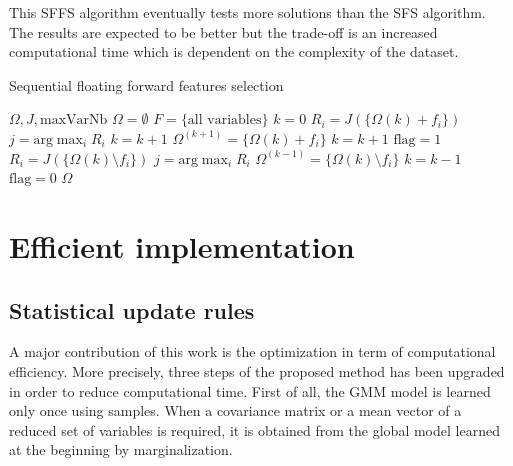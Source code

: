 \documentclass[journal,peerreview,onecolumn]{IEEEtran}
\begin{document}
            This SFFS algorithm eventually tests more solutions than the SFS algorithm. The results are expected to be better but the trade-off is an increased computational time which is dependent on the complexity of the dataset.

            \begin{algorithm}
            \caption{Sequential floating forward features selection\label{alg:sffs}}
            {\footnotesize
            \begin{algorithmic}[1]
            \REQUIRE $\Omega,J,\text{maxVarNb}$
            \STATE $\Omega=\emptyset$
            \STATE $F=\text{\{all variables\}}$
            \STATE $k=0$
            \STATE $R_i = J(\{\Omega{(k)} + f_i\})$
            \ENDFOR
            \STATE $j=\text{arg} \max_{i} R_i$
            \STATE $k=k+1$
            \ELSE
            \STATE $\Omega^{(k+1)} = \{\Omega{(k)} + f_i\}$
            \STATE $k=k+1$
            \STATE $\text{flag}=1$
            \STATE $R_i = J(\{\Omega{(k)}\setminus f_i\})$
            \ENDFOR
            \STATE $j=\text{arg} \max_{i} R_i$
            \STATE $\Omega^{(k-1)} = \{\Omega{(k)} \setminus f_i\}$
            \STATE $k=k-1$
            \ELSE
            \STATE $\text{flag}=0$
            \ENDIF
            \ENDWHILE
            \ENDIF
            \ENDWHILE
            \RETURN $\Omega$
            \end{algorithmic}
            }
            \end{algorithm}


\section{Efficient implementation}
\label{sec:implementation}

    \subsection{Statistical update rules}
    A major contribution of this work is the optimization in term of computational efficiency. More precisely, three steps of the proposed method has been upgraded in order to reduce computational time. First of all, the GMM model is learned only once using samples. When a covariance matrix or a mean vector of a reduced set of variables is required, it is obtained from the global model learned at the beginning by marginalization.
\end{document}
